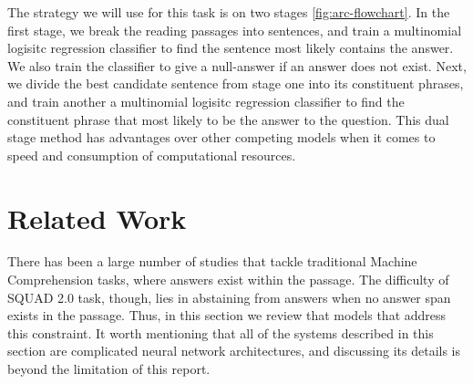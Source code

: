 The strategy we will use for this task is on two stages \ref{fig:arc-flowchart}. In the first stage, we break the reading passages into sentences, and train a multinomial logisitc regression classifier to find the sentence most likely contains the answer. We also train the classifier to give a null-answer if an answer does not exist. Next, we divide the best candidate sentence from stage one into its constituent phrases, and train another a multinomial logisitc regression classifier to find the constituent phrase that most likely to be the answer to the question. This dual stage method has advantages over other competing models when it comes to speed and consumption of computational resources. 




\section{Related Work}

There has been a large number of studies that tackle traditional Machine Comprehension tasks, where answers exist within the passage. The difficulty of SQUAD 2.0 task, though, lies in abstaining from answers when no answer span exists in the passage. Thus, in this section we review that models that address this constraint. It worth mentioning that all of the systems described in this section are complicated neural network architectures, and discussing its details is beyond the limitation of this report. 

